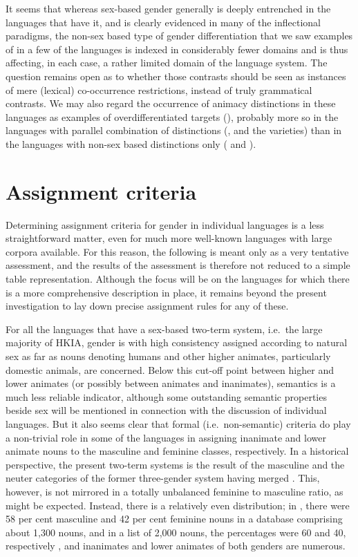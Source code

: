 \documentclass[output=collectionpaper]{langsci/langscibook}
\begin{document}
It seems that whereas sex-based gender generally is deeply entrenched in the languages that have it, and is clearly evidenced in many of the inflectional paradigms, the non-sex based type of gender differentiation that we saw examples of in a few of the languages is indexed in considerably fewer domains and is thus affecting, in each case, a rather limited domain of the language system. The question remains open as to whether those contrasts should be seen as instances of mere (lexical) co-occurrence restrictions, instead of truly grammatical contrasts. We may also regard the occurrence of animacy distinctions in these languages as examples of overdifferentiated targets (\citealt[168--169]{Corbett1991}), probably more so in the languages with parallel combination of distinctions (,  and the  varieties) than in the languages with non-sex based distinctions only ( and ).

\section{Assignment criteria}
\label{sec:Lilje:6}

Determining  assignment criteria for gender in individual languages is a less straightforward matter, even for much more well-known languages with large corpora available. For this reason, the following is meant only as a very tentative assessment, and the results of the assessment is therefore not reduced to a simple table representation. Although the focus will be on the languages for which there is a more comprehensive description in place, it remains beyond the present investigation to lay down precise assignment rules for any of these.

For all the languages that have a sex-based two-term system, i.e.\ the large majority of HKIA, gender is with high consistency assigned according to natural sex as far as nouns denoting humans and other higher animates, particularly domestic animals, are concerned. Below this cut-off point between higher and lower animates (or possibly between animates and inanimates), semantics is a much less reliable indicator, although some outstanding semantic properties beside sex will be mentioned in connection with the discussion of individual languages. But it also seems clear that formal (i.e.\ non-semantic) criteria do play a non-trivial role in some of the languages in assigning inanimate and lower animate nouns to the masculine and feminine classes, respectively. In a historical perspective, the present two-term systems is the result of the masculine and the neuter categories of the former three-gender system having merged \citep[221]{Masica1991}. This, however, is not mirrored in a totally unbalanced feminine to masculine ratio, as might be expected. Instead, there is a relatively even distribution; in , there were 58 per cent masculine and 42 per cent feminine nouns in a database comprising about 1,300 nouns, and in a  list of 2,000 nouns, the percentages were 60 and 40, respectively \citep[82]{Baart1999}, and inanimates and lower animates of both genders are numerous.
\end{document}
